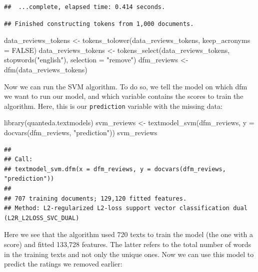 \documentclass[
]{article}
\newenvironment{Shaded}{\begin{snugshade}}{\end{snugshade}}
\newcommand{\AttributeTok}[1]{\textcolor[rgb]{0.77,0.63,0.00}{#1}}
\newcommand{\ConstantTok}[1]{\textcolor[rgb]{0.00,0.00,0.00}{#1}}
\newcommand{\FunctionTok}[1]{\textcolor[rgb]{0.00,0.00,0.00}{#1}}
\newcommand{\NormalTok}[1]{#1}
\newcommand{\OtherTok}[1]{\textcolor[rgb]{0.56,0.35,0.01}{#1}}
\newcommand{\StringTok}[1]{\textcolor[rgb]{0.31,0.60,0.02}{#1}}
\begin{document}
\begin{verbatim}
##  ...complete, elapsed time: 0.414 seconds.
\end{verbatim}

\begin{verbatim}
## Finished constructing tokens from 1,000 documents.
\end{verbatim}

\begin{Shaded}
\begin{Highlighting}[]
\NormalTok{data\_reviews\_tokens }\OtherTok{\textless{}{-}} \FunctionTok{tokens\_tolower}\NormalTok{(data\_reviews\_tokens, }\AttributeTok{keep\_acronyms =} \ConstantTok{FALSE}\NormalTok{)}
\NormalTok{data\_reviews\_tokens }\OtherTok{\textless{}{-}} \FunctionTok{tokens\_select}\NormalTok{(data\_reviews\_tokens, }\FunctionTok{stopwords}\NormalTok{(}\StringTok{"english"}\NormalTok{), }\AttributeTok{selection =} \StringTok{"remove"}\NormalTok{)}
\NormalTok{dfm\_reviews }\OtherTok{\textless{}{-}} \FunctionTok{dfm}\NormalTok{(data\_reviews\_tokens)}
\end{Highlighting}
\end{Shaded}

Now we can run the SVM algorithm. To do so, we tell the model on which dfm we want to run our model, and which variable contains the scores to train the algorithm. Here, this is our \texttt{prediction} variable with the missing data:

\begin{Shaded}
\begin{Highlighting}[]
\FunctionTok{library}\NormalTok{(quanteda.textmodels)}
\NormalTok{svm\_reviews }\OtherTok{\textless{}{-}} \FunctionTok{textmodel\_svm}\NormalTok{(dfm\_reviews, }\AttributeTok{y =} \FunctionTok{docvars}\NormalTok{(dfm\_reviews, }\StringTok{"prediction"}\NormalTok{))}
\NormalTok{svm\_reviews}
\end{Highlighting}
\end{Shaded}

\begin{verbatim}
## 
## Call:
## textmodel_svm.dfm(x = dfm_reviews, y = docvars(dfm_reviews, "prediction"))
## 
## 707 training documents; 129,120 fitted features.
## Method: L2-regularized L2-loss support vector classification dual (L2R_L2LOSS_SVC_DUAL)
\end{verbatim}

Here we see that the algorithm used 720 texts to train the model (the one with a score) and fitted 133,728 features. The latter refers to the total number of words in the training texts and not only the unique ones. Now we can use this model to predict the ratings we removed earlier:
\end{document}
